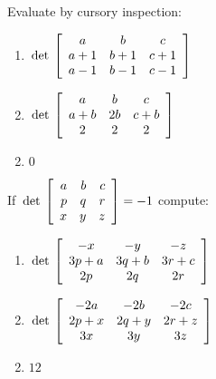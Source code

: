 \begin{multicols}{2}
\begin{ex}
Evaluate by cursory inspection:


\begin{enumerate}[label={\alph*.}]
\item $\thinspace\operatorname{det\medspace} \left[ \begin{array}{ccc}
a & b & c  \\
a+1 & b+1 & c+1  \\
a-1 & b-1 & c-1 
\end{array} \right]$

\item $\thinspace\operatorname{det\medspace} \left[ \begin{array}{ccc}
a & b & c  \\
a+b & 2b & c+b  \\
2 & 2 & 2 
\end{array} \right]$

\end{enumerate}
\begin{sol}
\begin{enumerate}[label={\alph*.}]
\setcounter{enumi}{1}
\item  $0$

\end{enumerate}
\end{sol}
\end{ex}

\begin{ex}
If $\thinspace\operatorname{det\medspace} \left[ \begin{array}{rrr}
a & b & c  \\
p & q & r  \\
x & y & z 
\end{array} \right] = -1$
compute:

\begin{enumerate}[label={\alph*.}]
\item $\thinspace\operatorname{det\medspace} \left[ \begin{array}{ccc}
-x & -y & -z  \\
3p+a & 3q+b & 3r+c  \\
2p & 2q & 2r 
\end{array} \right]$


\item $\thinspace\operatorname{det\medspace} \left[ \begin{array}{ccc}
-2a & -2b & -2c  \\
2p+x & 2q+y & 2r+z  \\
3x & 3y & 3z 
\end{array} \right]$


\end{enumerate}
\begin{sol}
\begin{enumerate}[label={\alph*.}]
\setcounter{enumi}{1}
\item  $12$


\end{enumerate}
\end{sol}
\end{ex}
\end{multicols}
